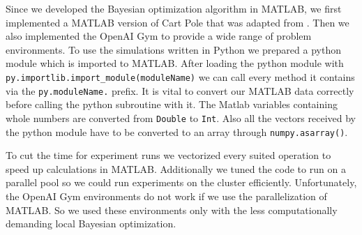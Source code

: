 Since we developed the Bayesian optimization algorithm in MATLAB, we first implemented a MATLAB version of Cart Pole that was adapted from \cite{joseCode}. Then we also implemented the OpenAI Gym \cite{DBLP:journals/corr/BrockmanCPSSTZ16} to provide a wide range of problem environments. To use the simulations written in Python we prepared a python module which is imported to MATLAB. After loading the python module with \verb|py.importlib.import_module(moduleName)| we can call every method it contains via the \verb|py.moduleName.| prefix. It is vital to convert our MATLAB data correctly before calling the python subroutine with it. The Matlab variables containing whole numbers are converted from \verb|Double| to \verb|Int|. Also all the vectors received by the python module have to be converted to an array through \verb|numpy.asarray()|.

To cut the time for experiment runs we vectorized every suited operation to speed up calculations in MATLAB. Additionally we tuned the code to run on a parallel pool so we could run experiments on the cluster efficiently. Unfortunately, the OpenAI Gym environments do not work if we use the parallelization of MATLAB. So we used these environments only with the less computationally demanding local Bayesian optimization.\\

%

